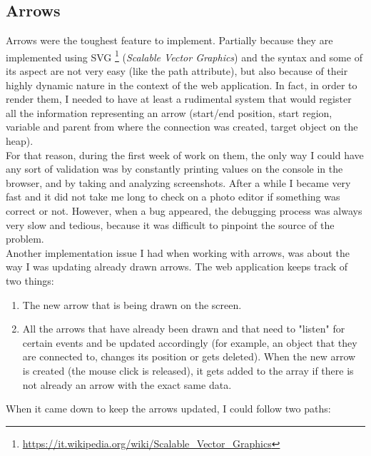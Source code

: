 \documentclass[]{usiinfbachelorproject}
\begin{document}
\subsection{Arrows}

Arrows were the toughest feature to implement. Partially because they are implemented using SVG \footnote{\url{https://it.wikipedia.org/wiki/Scalable_Vector_Graphics}} (\emph{Scalable Vector Graphics}) and the syntax and some of its aspect are not very easy (like the path attribute), but also because of their highly dynamic nature in the context of the web application. In fact, in order to render them, I needed to have at least a rudimental system that would register all the information representing an arrow (start/end position, start region, variable and parent from where the connection was created, target object on the heap).\\For that reason, during the first week of work on them, the only way I could have any sort of validation was by constantly printing values on the console in the browser, and by taking and analyzing screenshots. After a while I became very fast and it did not take me long to check on a photo editor if something was correct or not. However, when a bug appeared, the debugging process was always very slow and tedious, because it was difficult to pinpoint the source of the problem.\\

\noindent Another implementation issue I had when working with arrows, was about the way I was updating already drawn arrows. The web application keeps track of two things:

\begin{enumerate}
	\item The new arrow that is being drawn on the screen.
	\item All the arrows that have already been drawn and that need to "listen" for certain events and be updated accordingly (for example, an object that they are connected to, changes its position or gets deleted). When the new arrow is created (the mouse click is released), it gets added to the array if there is not already an arrow with the exact same data. 
\end{enumerate}

\vspace{\fill}

\pagebreak

\noindent When it came down to keep the arrows updated, I could follow two paths:
\end{document}
